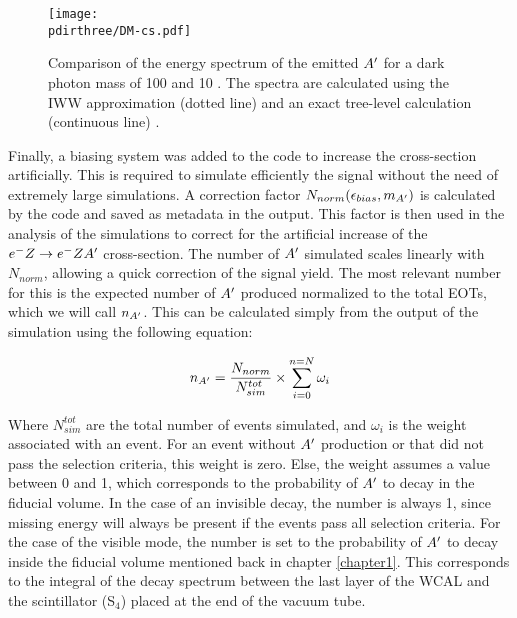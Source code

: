 \begin{figure}[htb!]
  \centering
  \texttt{[image: \\pdirthree/DM-cs.pdf]}
  \caption[IWW vs tree-level energy spectra]{Comparison of the energy spectrum of the emitted $A'$ for a dark photon mass of 100 \mev and 10 \mev. The spectra are calculated using the IWW approximation (dotted line) and an exact tree-level calculation (continuous line) \cite{DMsimulation}.}
  \label{fig:dm-iww-tl}
\end{figure}


Finally, a biasing system was added to the code to increase the cross-section artificially. This is required to simulate efficiently the signal without the need of extremely large simulations. A correction factor $N_{norm}(\epsilon_{bias},m_{A'})$ is calculated by the code and saved as metadata in the output. This factor is then used in the analysis of the simulations to correct for the artificial increase of the $e^- Z \to e^- Z A'$ cross-section. The number of $A'$ simulated scales linearly with $N_{norm}$, allowing a quick correction of the signal yield. The most relevant number for this is the expected number of $A'$ produced normalized to the total EOTs, which we will call $n_{A'}$. This can be calculated simply from the output of the simulation using the following equation:

\begin{equation}
  \label{eq:1}
  n_{A'} = \frac{N_{norm}}{N^{tot}_{sim}} \times \sum^{n=N}_{i=0} \omega_i
\end{equation}

Where $N^{tot}_{sim}$ are the total number of events simulated, and $\omega_i$ is the weight associated with an event. For an event without $A'$ production or that did not pass the selection criteria, this weight is zero. Else, the weight assumes a value between 0 and 1, which corresponds to the probability of $A'$ to decay in the fiducial volume. In the case of an invisible decay, the number is always 1, since missing energy will always be present if the events pass all selection criteria. For the case of the visible mode, the number is set to the probability of $A'$ to decay inside the fiducial volume mentioned back in chapter \ref{chapter1}. This corresponds to the integral of the decay spectrum between the last layer of the WCAL and the scintillator (S$_4$) placed at the end of the vacuum tube.

